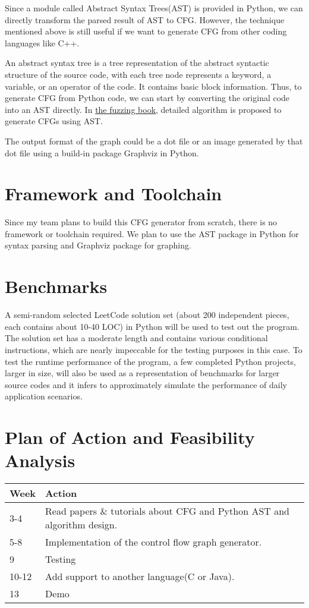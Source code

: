 \documentclass[11pt]{article}
\begin{document}
Since a module called Abstract Syntax Trees(AST) is provided in Python, we can directly transform the parsed result of AST to CFG. However, the technique mentioned above is still useful if we want to generate CFG from other coding languages like C++.

An abstract syntax tree is a tree representation of the abstract syntactic structure of the source code, with each tree node represents a keyword, a variable, or an operator of the code. It contains basic block information. Thus, to generate CFG from Python code, we can start by converting the original code into an AST directly. In \href{https://www.fuzzingbook.org/html/ControlFlow.html}{the fuzzing book}, detailed algorithm is proposed to generate CFGs using AST.

The output format of the graph could be a dot file or an image generated by that dot file using a build-in package Graphviz in Python.

\section{Framework and Toolchain}\label{section-framework}
Since my team plans to build this CFG generator from scratch, there is no framework or toolchain required. We plan to use the AST package in Python for syntax parsing and Graphviz package for graphing.

\section{Benchmarks}\label{section-benchmarks}
A semi-random selected LeetCode solution set (about 200 independent pieces, each contains about 10-40 LOC) in Python will be used to test out the program. The solution set has a moderate length and contains various conditional instructions, which are nearly impeccable for the testing purposes in this case. To test the runtime performance of the program, a few completed Python projects, larger in size, will also be used as a representation of benchmarks for larger source codes and it infers to approximately simulate the performance of daily application scenarios.

\section{Plan of Action and Feasibility Analysis}\label{section-plan}
\begin{tabular}{| l | l |}
\hline
Week & Action \\ \hline
3-4 & Read papers \& tutorials about CFG and Python AST and algorithm design. \\ \hline
5-8 & Implementation of the control flow graph generator. \\ \hline
9 & Testing \\ \hline
10-12 & Add support to another language(C or Java). \\ \hline
13 & Demo \\ \hline
\end{tabular}
\end{document}
